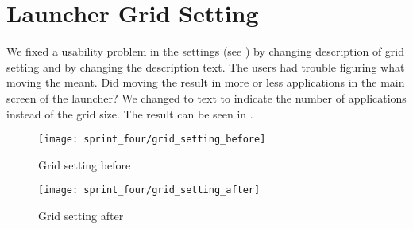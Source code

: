 
\section{Launcher Grid Setting}
\label{sec:launcher_grid_setting}
We fixed a usability problem in the \launcher settings (see ) by changing description of grid setting and by changing the description text. The users had trouble figuring what moving the  meant. Did moving the  result in more or less applications in the main screen of the launcher? We changed to text to indicate the number of applications instead of the grid size. The result can be seen in . 

\begin{figure}[!htbp]
        \centering
        \texttt{[image: sprint\_four/grid\_setting\_before]}
        \caption{Grid setting before}
        \label{fig:launcher_grid_settings_old}
\end{figure}

\begin{figure}[!htbp]
        \centering
        \texttt{[image: sprint\_four/grid\_setting\_after]}
        \caption{Grid setting after}
        \label{fig:launcher_grid_settings_new}
\end{figure} 